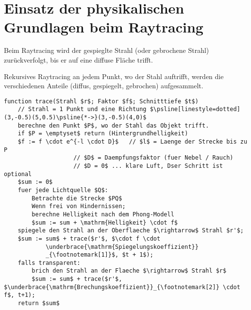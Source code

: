 \section{Einsatz der physikalischen Grundlagen beim Raytracing}
Beim Raytracing wird der gespieglte Strahl (oder gebrochene Strahl) zurückverfolgt,
bis er auf eine diffuse Fläche trifft.
\begin{center}
\end{center}
Rekursives Raytracing an jedem Punkt, wo der Stahl auftrifft, werden die verschiedenen Anteile (diffus, gespiegelt,
gebrochen) aufgesammelt.
\begin{lstlisting}[morekeywords=function]
function trace(Strahl $r$; Faktor $f$; Schnitttiefe $t$)
	// Strahl = 1 Punkt und eine Richtung $\psline[linestyle=dotted](3,-0.5)(5,0.5)\psline{*->}(3,-0.5)(4,0)$
	berechne den Punkt $P$, wo der Stahl das Objekt trifft.
	if $P = \emptyset$ return (Hintergrundhelligkeit)
	$f := f \cdot e^{-l \cdot D}$	// $l$ = Laenge der Strecke bis zu P
					// $D$ = Daempfungsfaktor (fuer Nebel / Rauch)
					// $D = 0$ ... klare Luft, Dser Schritt ist optional
	$sum := 0$
	fuer jede Lichtquelle $Q$:
		Betrachte die Strecke $PQ$
		Wenn frei von Hindernissen;
		berechne Helligkeit nach dem Phong-Modell
		$sum := sum + \mathrm{Helligkeit} \cdot f$
	spiegele den Strahl an der Oberflaeche $\rightarrow$ Strahl $r'$;
	$sum := sum$ + trace($r'$, $\cdot f \cdot
			\underbrace{\mathrm{Spiegelungskoeffizient}}
			_{\footnotemark[1]}$, $t + 1$);
	falls transparent:
		brich den Strahl an der Flaeche $\rightarrow$ Strahl $r$
		$sum := sum$ + trace($r'$, $\underbrace{\mathrm{Brechungskoeffizient}}_{\footnotemark[2]} \cdot f$, t+1);
	return $sum$
\end{lstlisting}

